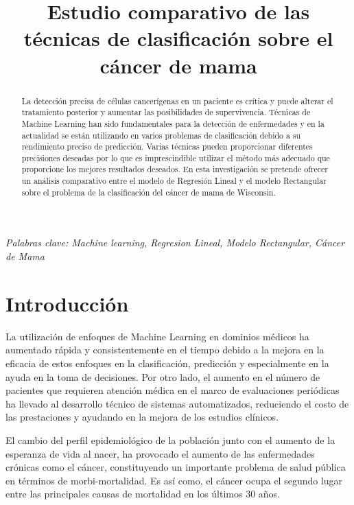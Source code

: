 \documentclass[conference]{IEEEtran}
\begin{document}
\title{Estudio comparativo de las técnicas de clasificación sobre el cáncer de mama}

\author{
}


\maketitle

\begin{abstract}
La detección precisa de células cancerígenas en un paciente es crítica y puede alterar el tratamiento posterior y aumentar las posibilidades de supervivencia. Técnicas de Machine Learning han sido fundamentales para la detección de enfermedades y en la actualidad se están utilizando en varios problemas de clasificación debido a su rendimiento preciso de predicción. Varias técnicas pueden proporcionar diferentes precisiones deseadas por lo que es imprescindible utilizar el método más adecuado que proporcione los mejores resultados deseados. En esta investigación se pretende ofrecer un análisis comparativo entre el modelo de Regresión Lineal y el modelo Rectangular sobre el problema de la clasificación del cáncer de mama de Wisconsin.
\end{abstract}
\emph{Palabras clave: Machine learning, Regresion Lineal, Modelo Rectangular, Cáncer de Mama}

\IEEEpeerreviewmaketitle


\section{Introducción}
La utilización de enfoques de Machine Learning en dominios médicos ha aumentado rápida y consistentemente en el tiempo debido a la mejora en la eficacia de estos enfoques en la clasificación, predicción y especialmente en la ayuda en la toma de decisiones. Por otro lado, el aumento en el número de pacientes que requieren atención médica en el marco de evaluaciones periódicas ha llevado al desarrollo técnico de sistemas automatizados, reduciendo el costo de las prestaciones y ayudando en la mejora de los estudios clínicos. \newline

El cambio del perfil epidemiológico de la población junto con el aumento de la esperanza de vida al nacer, ha provocado el aumento de las enfermedades crónicas como el cáncer, constituyendo un importante problema de salud pública en términos de morbi-mortalidad. Es así como, el cáncer ocupa el segundo lugar entre las principales causas de mortalidad en los últimos 30 años. \newline
\end{document}
